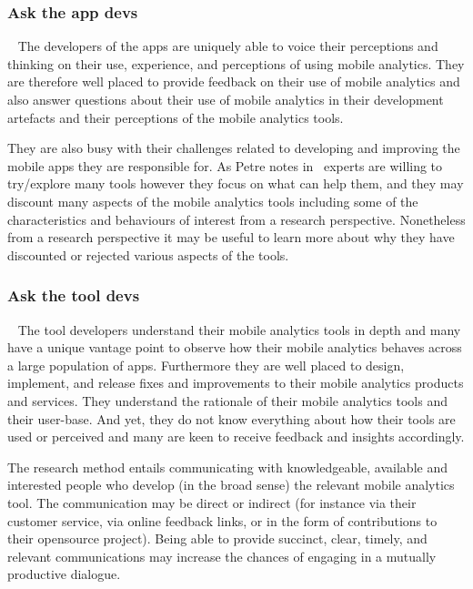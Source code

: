 \subsubsection{Ask the app devs}~\label{section-ask-the-app-devs-research-method}
The developers of the apps are uniquely able to voice their perceptions and thinking on their use, experience, and perceptions of using mobile analytics. They are therefore well placed to provide feedback on their use of mobile analytics and also answer questions about their use of mobile analytics in their development artefacts and their perceptions of the mobile analytics tools.

They are also busy with their challenges related to developing and improving the mobile apps they are responsible for. As Petre notes in~\citep{petre2009_insights_from_expert_software_design_practice} experts are willing to try/explore many tools however they focus on what can help them, and they may discount many aspects of the mobile analytics tools including some of the characteristics and behaviours of interest from a research perspective. Nonetheless from a research perspective it may be useful to learn more about why they have discounted or rejected various aspects of the tools. 

\subsubsection{Ask the tool devs}~\label{section-ask-the-tool-devs-research-method} 
The tool developers understand their mobile analytics tools in depth and many have a unique vantage point to observe how their mobile analytics behaves across a large population of apps. Furthermore they are well placed to design, implement, and release fixes and improvements to their mobile analytics products and services. They understand the rationale of their mobile analytics tools and their user-base. And yet, they do not know everything about how their tools are used or perceived and many are keen to receive feedback and insights accordingly.

The research method entails communicating with knowledgeable, available and interested people who develop (in the broad sense) the relevant mobile analytics tool. The communication may be direct or indirect (for instance via their customer service, via online feedback links, or in the form of contributions to their opensource project). Being able to provide succinct, clear, timely, and relevant communications may increase the chances of engaging in a mutually productive dialogue.

